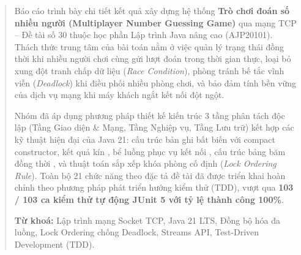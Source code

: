 \begin{abstract}

Báo cáo trình bày chi tiết kết quả xây dựng hệ thống \textbf{Trò chơi đoán số
nhiều người (Multiplayer Number Guessing Game)} qua mạng TCP -- Đề tài số 30
thuộc học phần Lập trình Java nâng cao (AJP20101). Thách thức trung tâm của
bài toán nằm ở việc quản lý trạng thái đồng thời khi nhiều người chơi cùng gửi
lượt đoán trong thời gian thực, loại bỏ xung đột tranh chấp dữ liệu
(\textit{Race Condition}), phòng tránh bế tắc vĩnh viễn (\textit{Deadlock})
khi điều phối nhiều phòng chơi, và bảo đảm tính bền vững của dịch vụ mạng khi
máy khách ngắt kết nối đột ngột.

Nhóm đã áp dụng phương pháp thiết kế kiến trúc 3 tầng phân tách độc lập (Tầng
Giao diện \& Mạng, Tầng Nghiệp vụ, Tầng Lưu trữ) kết hợp các kỹ thuật hiện đại
của Java 21: cấu trúc bản ghi bất biến  với compact constructor,
kết quả kín , bể luồng phục vụ kết nối
, cấu trúc bảng băm đồng thời
, và thuật toán sắp xếp khóa phòng cố định
(\textit{Lock Ordering Rule}). Toàn bộ 21 chức năng theo đặc tả đề tài đã được
triển khai hoàn chỉnh theo phương pháp phát triển hướng kiểm thử (TDD), vượt
qua \textbf{103 / 103 ca kiểm thử tự động JUnit 5 với tỷ lệ thành công 100\%}.

\vspace{0.8em}
\noindent\textbf{Từ khoá:} Lập trình mạng Socket TCP, Java 21 LTS, Đồng bộ hóa
đa luồng, Lock Ordering chống Deadlock, Streams API, Test-Driven Development
(TDD).

\end{abstract}
